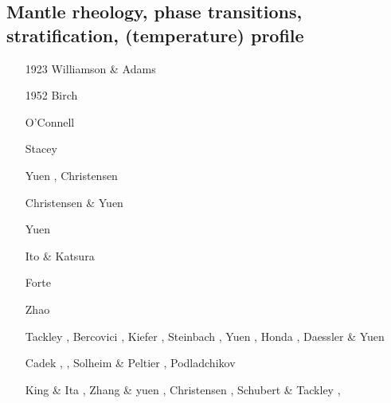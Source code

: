 \subsection{Mantle rheology, phase transitions, stratification, (temperature) profile}

\begin{scriptsize}
\begin{itemize}
\item[1923] Williamson \& Adams \cite{wiad23}
\item[1952] Birch \cite{birc52}
\item[\nineteenseventysix] O'Connell \cite{ocon76}
\item[\nineteenseventyseven] Stacey \cite{stac77}
\item[\nineteeneightytwo] Yuen \etal \cite{yusb82}, Christensen \cite{chri82}
\item[\nineteeneightyfive] Christensen \& Yuen \cite{chyu85}
\item[\nineteeneightysix] Yuen \cite{yuen86} 
\item[\nineteeneightynine] Ito \& Katsura \cite{itka89} 
\item[\nineteenninetyone] Forte \etal \cite{fopd91} 
\item[\nineteenninetytwo] Zhao \etal \cite{zhyh92}
\item[\nineteenninetythree] Tackley \etal \cite{tasg93}, Bercovici \etal \cite{best93}, 
                      Kiefer \cite{kief93}, Steinbach \etal \cite{styz93},
                      Yuen \etal \cite{yucc93}, Honda \etal \cite{hoby93}, 
                      Daessler \& Yuen \cite{dayu93} \\
\item[\nineteenninetyfour] Cadek \etal \cite{cays94}, \cite{vayv94}
                    \cite{zhgu94b}\cite{styu94}, Solheim \& Peltier \cite{sope94},
                    Podladchikov \etal \cite{popy94}
\item[\nineteenninetyfive] King \& Ita \cite{kiit95}, Zhang \& yuen \cite{zhyu95}, 
                     Christensen \cite{chri95}, Schubert \& Tackley \cite{scta95},

\end{itemize}
\end{scriptsize}
